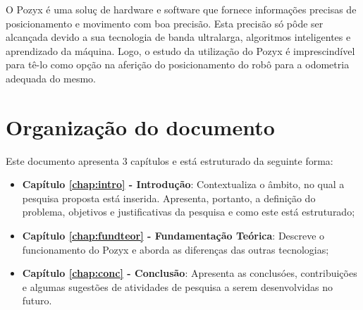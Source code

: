 O Pozyx \'e uma solu\c{c} de hardware e software que fornece informa\c{c}\~oes precisas de posicionamento e movimento com boa precis\~ao.
Esta precis\~ao s\'o p\^ode ser alcan\c{c}ada devido a sua tecnologia de banda ultralarga, algoritmos inteligentes e aprendizado da m\'aquina.
Logo, o estudo da utiliza\c{c}\~ao do Pozyx \'e imprescind\'ivel para t\^e-lo como op\c{c}\~ao na aferi\c{c}\~ao do posicionamento do rob\^o para a odometria adequada do mesmo. 

\section{Organização do documento}
\label{section:organizacao}

Este documento apresenta $3$ capítulos e está estruturado da seguinte forma:

\begin{itemize}

\item \textbf{Capítulo \ref{chap:intro} - Introdução}: Contextualiza o âmbito, no qual a pesquisa proposta está inserida. Apresenta, portanto, a definição do problema, objetivos e justificativas da pesquisa e como este \thetypeworkthree está estruturado;
\item \textbf{Capítulo \ref{chap:fundteor} - Fundamentação Teórica}: Descreve o funcionamento do Pozyx e aborda as diferenças das outras tecnologias;
\item \textbf{Capítulo \ref{chap:conc} - Conclusão}: Apresenta as conclusóes, contribuições e algumas sugestões de atividades de pesquisa a serem desenvolvidas no futuro.

\end{itemize}
